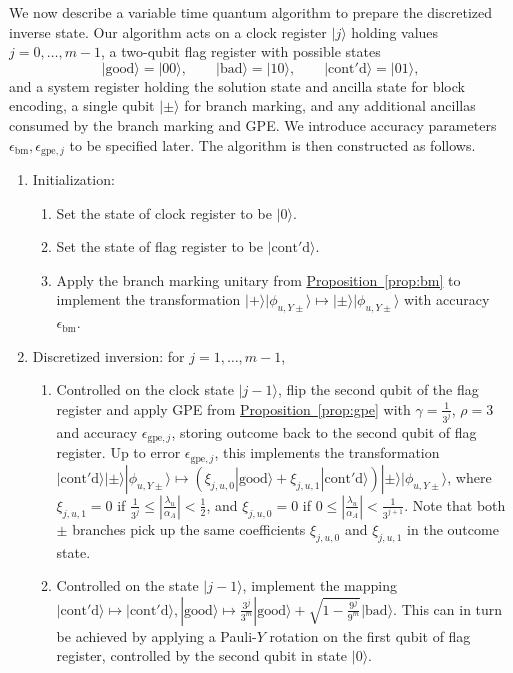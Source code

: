 \documentclass[letterpaper,onecolumn,11pt,accepted=2026-02-14]{quantumarticle}
\newcommand{\abs}[1]{\left\lvert#1\right\rvert}
\theoremstyle{remark}
\theoremstyle{plain}
\newcommand{\prop}[1]{\hyperref[prop:#1]{Proposition~\ref*{prop:#1}}}
\newcommand{\ket}[1]{|#1\rangle}
\begin{document}
We now describe a variable time quantum algorithm to prepare the discretized inverse state. Our algorithm acts on a clock register $\ket{j}$ holding values $j=0,\ldots,m-1$, a two-qubit flag register with possible states
\begin{equation}
    \ket{\mathrm{good}}=\ket{00},\qquad
    \ket{\mathrm{bad}}=\ket{10},\qquad
    \ket{\mathrm{cont'd}}=\ket{01},
\end{equation}
and a system register holding the solution state and ancilla state for block encoding, a single qubit $\ket{\pm}$ for branch marking, and any additional ancillas consumed by the branch marking and GPE. We introduce accuracy parameters $\epsilon_{\text{bm}},\epsilon_{\text{gpe},j}$ to be specified later. The algorithm is then constructed as follows.
\begin{enumerate}
    \item Initialization: 
    \begin{enumerate}
        \item Set the state of clock register to be $\ket{0}$.
        \item Set the state of flag register to be $\ket{\mathrm{cont'd}}$. 
        \item Apply the branch marking unitary from \prop{bm} to implement the transformation $\ket{+}\ket{\phi_{u,Y\pm}}\mapsto\ket{\pm}\ket{\phi_{u,Y\pm}}$ with accuracy $\epsilon_{\text{bm}}$.
    \end{enumerate}
    \item Discretized inversion: for $j=1,\ldots,m-1$,
    \begin{enumerate}
        \item Controlled on the clock state $\ket{j-1}$, flip the second qubit of the flag register and apply GPE from \prop{gpe} with $\gamma=\frac{1}{3^j}$, $\rho=3$ and accuracy $\epsilon_{\text{gpe},j}$, storing outcome back to the second qubit of flag register. Up to error $\epsilon_{\text{gpe},j}$, this implements the transformation $\ket{\mathrm{cont'd}}\ket{\pm}\ket{\phi_{u,Y\pm}}\mapsto\left(\xi_{j,u,0}\ket{\mathrm{good}}+\xi_{j,u,1}\ket{\mathrm{cont'd}}\right)\ket{\pm}\ket{\phi_{u,Y\pm}}$, where $\xi_{j,u,1}=0$ if $\frac{1}{3^j}\leq\abs{\frac{\lambda_u}{\alpha_A}}<\frac{1}{2}$, and $\xi_{j,u,0}=0$ if $0\leq\abs{\frac{\lambda_u}{\alpha_A}}<\frac{1}{3^{j+1}}$. Note that both $\pm$ branches pick up the same coefficients $\xi_{j,u,0}$ and $\xi_{j,u,1}$ in the outcome state.
        \item Controlled on the state $\ket{j-1}$, implement the mapping $\ket{\mathrm{cont'd}}\mapsto\ket{\mathrm{cont'd}},\ket{\mathrm{good}}\mapsto\frac{3^j}{3^m}\ket{\mathrm{good}}+\sqrt{1-\frac{9^j}{9^m}}\ket{\mathrm{bad}}$. This can in turn be achieved by applying a Pauli-$Y$ rotation on the first qubit of flag register, controlled by the second qubit in state $\ket{0}$.

\end{enumerate}
\end{enumerate}
\end{document}
